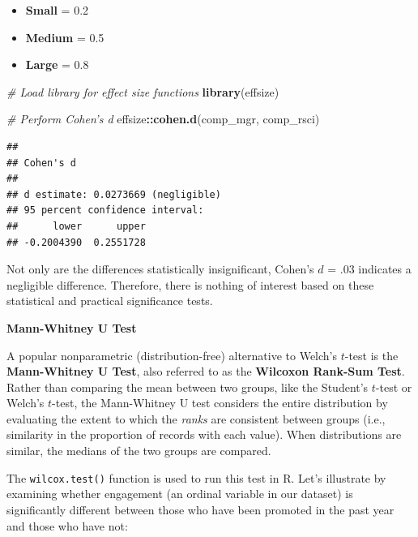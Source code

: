 \documentclass[]{book}
\newenvironment{Shaded}{\begin{snugshade}}{\end{snugshade}}
\newcommand{\CommentTok}[1]{\textcolor[rgb]{0.56,0.35,0.01}{\textit{#1}}}
\newcommand{\KeywordTok}[1]{\textcolor[rgb]{0.13,0.29,0.53}{\textbf{#1}}}
\newcommand{\NormalTok}[1]{#1}
\newcommand{\OperatorTok}[1]{\textcolor[rgb]{0.81,0.36,0.00}{\textbf{#1}}}
\providecommand{\tightlist}{%
  \setlength{\itemsep}{0pt}\setlength{\parskip}{0pt}}
\begin{document}
\begin{itemize}
\tightlist
\item
  \textbf{Small} = 0.2
\item
  \textbf{Medium} = 0.5
\item
  \textbf{Large} = 0.8
\end{itemize}

\begin{Shaded}
\begin{Highlighting}[]
\CommentTok{# Load library for effect size functions}
\KeywordTok{library}\NormalTok{(effsize)}

\CommentTok{# Perform Cohen's d}
\NormalTok{effsize}\OperatorTok{::}\KeywordTok{cohen.d}\NormalTok{(comp_mgr, comp_rsci)}
\end{Highlighting}
\end{Shaded}

\begin{verbatim}
## 
## Cohen's d
## 
## d estimate: 0.0273669 (negligible)
## 95 percent confidence interval:
##      lower      upper 
## -0.2004390  0.2551728
\end{verbatim}

Not only are the differences statistically insignificant, Cohen's \(d\) = .03 indicates a negligible difference. Therefore, there is nothing of interest based on these statistical and practical significance tests.

\textbf{Mann-Whitney U Test}

A popular nonparametric (distribution-free) alternative to Welch's \(t\)-test is the \textbf{Mann-Whitney U Test}, also referred to as the \textbf{Wilcoxon Rank-Sum Test}. Rather than comparing the mean between two groups, like the Student's \(t\)-test or Welch's \(t\)-test, the Mann-Whitney U test considers the entire distribution by evaluating the extent to which the \emph{ranks} are consistent between groups (i.e., similarity in the proportion of records with each value). When distributions are similar, the medians of the two groups are compared.

The \texttt{wilcox.test()} function is used to run this test in R. Let's illustrate by examining whether engagement (an ordinal variable in our dataset) is significantly different between those who have been promoted in the past year and those who have not:
\end{document}
